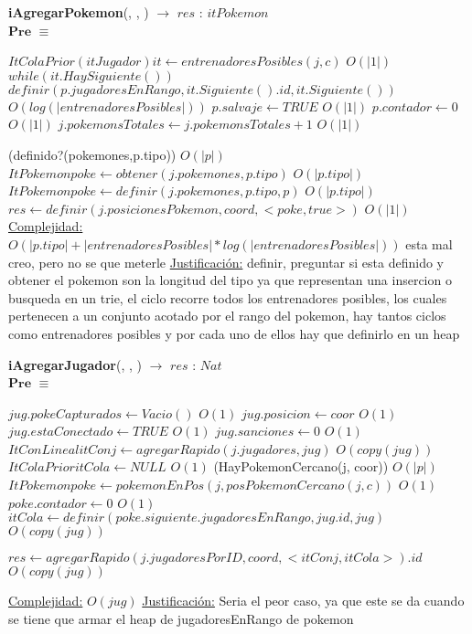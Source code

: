 \begin{algorithm}[H]{\textbf{iAgregarPokemon}(, , ) $\to$ $res$ : $itPokemon$}
	{\\ $\textbf{Pre}$ $\equiv$ }
	\begin{algorithmic}
	
	\State $ItColaPrior(itJugador) it \gets entrenadoresPosibles(j,c) $ \Comment $O(|1|)$
	\State $while(it.HaySiguiente()) $ {
	\State $definir(p.jugadoresEnRango, it.Siguiente().id, it.Siguiente()) $ \Comment$O(log(|entrenadoresPosibles|))$
	 }
	\State $p.salvaje \gets TRUE $ \Comment $O(|1|)$
	\State $p.contador \gets 0 $ \Comment $O(|1|)$
	\State $j.pokemonsTotales \gets j.pokemonsTotales+1 $ \Comment $O(|1|)$
	
	\If(definido?(pokemones,p.tipo)) \Comment $O(|p|)$
	\State $ItPokemon poke \gets obtener(j.pokemones,p.tipo) $ \Comment $O(|p.tipo|)$
	\Else
	\State $ItPokemon poke \gets definir(j.pokemones,p.tipo, p)$ \Comment $O(|p.tipo|)$
	\EndIf
	\State $res \gets definir(j.posicionesPokemon, coord, <poke,true>) $ \Comment $O(|1|)$
		\medskip
		\Statex \underline{Complejidad:} $O(|p.tipo| + |entrenadoresPosibles| * log(|entrenadoresPosibles|))$
		 esta mal creo, pero no se que meterle
		\Statex \underline{Justificación:}  definir, preguntar si esta definido 
		y obtener el pokemon son la longitud del tipo ya que representan una insercion 
		o busqueda en un trie, el ciclo recorre todos los entrenadores posibles, 
		los cuales pertenecen a un conjunto acotado por el rango del pokemon, 
		hay tantos ciclos como entrenadores posibles y por cada uno de ellos 
		hay que definirlo en un heap 
    \end{algorithmic}
\end{algorithm}

\begin{algorithm}[H]{\textbf{iAgregarJugador}(, , ) $\to$ $res$ : $Nat$}
	{\\ $\textbf{Pre}$ $\equiv$ }
	\begin{algorithmic}
	\State $jug.pokeCapturados \gets Vacio() $ \Comment $O(1)$
	\State $jug.posicion \gets coor $ \Comment $O(1)$
	\State $jug.estaConectado \gets TRUE $ \Comment $O(1)$
	\State $jug.sanciones \gets 0 $ \Comment $O(1)$
	\State $ItConLineal itConj \gets agregarRapido(j.jugadores,jug) $ \Comment $O(copy(jug))$
	\State $ItColaPrior itCola \gets NULL $ \Comment $O(1)$
	\If(HayPokemonCercano(j, coor)) \Comment $O(|p|)$
	\State $ItPokemon poke \gets pokemonEnPos(j,posPokemonCercano(j,c))$ \Comment $O(1)$
	\State $poke.contador \gets 0$ \Comment $O(1)$
	\State $ itCola \gets definir(poke.siguiente.jugadoresEnRango,jug.id,jug) $ \Comment $O(copy(jug))$
	\EndIf
	
	\State $res \gets agregarRapido(j.jugadoresPorID, coord, <itConj,itCola>).id $ \Comment $O(copy(jug))$

	
	
		\medskip
		\Statex \underline{Complejidad:} $O(jug)$
		\Statex \underline{Justificación:} Seria el peor caso, ya que este se da cuando se tiene que armar el heap de jugadoresEnRango de pokemon
    \end{algorithmic}
\end{algorithm}

